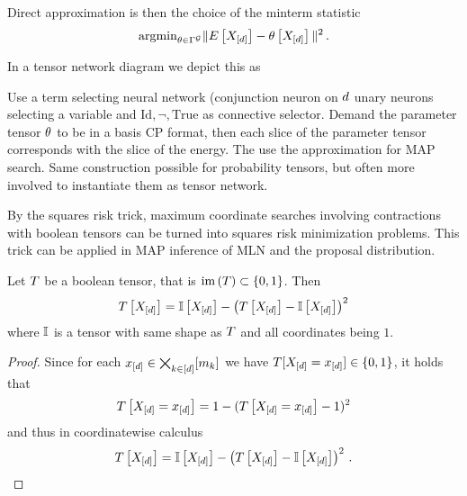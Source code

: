 Direct approximation is then the choice of the minterm statistic
	\[ \mathrm{argmin}_{\theta\in\Gamma^{\mathcal{G}}} \|E\left[X_{[d]}\right] - \theta\left[X_{[d]}\right]\|^2 \, . \]

In a tensor network diagram we depict this as
\begin{center}
    
\end{center}


\begin{example}
	Use a term selecting neural network (conjunction neuron on $d$ unary neurons selecting a variable and $\mathrm{Id},\lnot,\mathrm{True}$ as connective selector.
	Demand the parameter tensor $\theta$ to be in a basis CP format, then each slice of the parameter tensor corresponds with the slice of the energy.
	The use the approximation for MAP search.
	Same construction possible for probability tensors, but often more involved to instantiate them as tensor network.
\end{example}




By the squares risk trick, maximum coordinate searches involving contractions with boolean tensors can be turned into squares risk minimization problems.
This trick can be applied in MAP inference of MLN and the proposal distribution.


\begin{lemma}
	Let $T$ be a boolean tensor, that is $\mathrm{im}\left(T\right)\subset\{0,1\}$.
	Then
		\[ T\left[X_{[d]}\right] = \mathbb{I}\left[X_{[d]}\right] - \left( T\left[X_{[d]}\right] - \mathbb{I}\left[X_{[d]}\right] \right)^2  \]
	where $\mathbb{I}$ is a tensor with same shape as $T$ and all coordinates being $1$.
\end{lemma}
\begin{proof}
	Since for each $x_{[d]}\in\bigtimes_{k\in[d]}[m_{k}]$ we have $T[X_{[d]}=x_{[d]}]\in\{0,1\}$, it holds that
		\[ T\left[X_{[d]}=x_{[d]}\right] = 1 - (T\left[X_{[d]}=x_{[d]}\right]-1)^2 \]
	and thus in coordinatewise calculus
		\[ T\left[X_{[d]}\right] = \mathbb{I}\left[X_{[d]}\right] - \left( T\left[X_{[d]}\right] - \mathbb{I}\left[X_{[d]}\right] \right)^2 \, .   \]
\end{proof}

